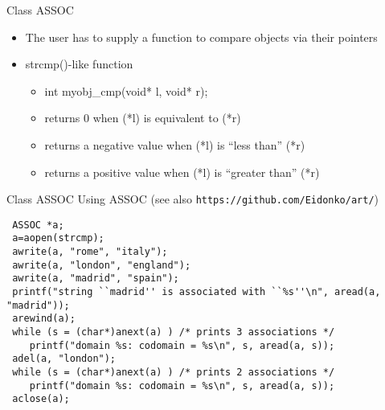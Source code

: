 \begin{frame}[fragile]{Class ASSOC}

\begin{itemize}
\item The user has to supply a function to compare objects via their
pointers
\item strcmp()-like function
  \begin{itemize}
  \item int myobj\_cmp(void* l, void* r);
  \item returns 0 when (*l) is equivalent to (*r)
  \item returns a negative value when (*l) is ``less than'' (*r)
  \item returns a positive value when (*l) is ``greater than'' (*r)
  \end{itemize}
\end{itemize}


\end{frame}
\begin{frame}[fragile]{Class ASSOC}
Using ASSOC (see also \verb"https://github.com/Eidonko/art/")


\vspace{20pt}

\begin{small}
\begin{verbatim}
 ASSOC *a;
 a=aopen(strcmp);
 awrite(a, "rome", "italy");
 awrite(a, "london", "england");
 awrite(a, "madrid", "spain");
 printf("string ``madrid'' is associated with ``%s''\n", aread(a, "madrid"));
 arewind(a);
 while (s = (char*)anext(a) ) /* prints 3 associations */
    printf("domain %s: codomain = %s\n", s, aread(a, s));
 adel(a, "london");
 while (s = (char*)anext(a) ) /* prints 2 associations */
    printf("domain %s: codomain = %s\n", s, aread(a, s));
 aclose(a);
\end{verbatim}
\end{small}

\end{frame}


